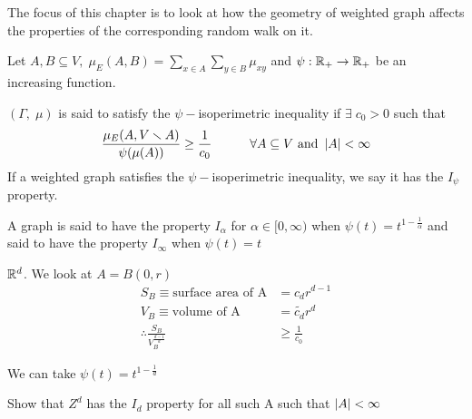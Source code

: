 \documentclass[main]{subfiles}
\begin{document}


The focus of this chapter is to look at how the geometry of weighted graph affects the properties of the corresponding random walk on it.

\begin{definition}
	Let $A, B \subseteq V, \; \mu_E(A,B) = \sum_{x \in A} \sum_{y \in B} \mu_{xy}$
	and $\psi: \mathbb R_+ \to \mathbb R_+$ be an increasing function.

	$(\Gamma,\;\mu)$ is said to satisfy the $\psi-$isoperimetric inequality if $\exists\;c_0>0$ such that
	\[\frac{\mu_E(A,V\smallsetminus A)}{\psi(\mu(A))} \geq \frac{1}{c_0} \hspace{3em} \forall A \subseteq V \text{ and }\left\lvert A\right\rvert < \infty\]
	If a weighted graph satisfies the $\psi-$isoperimetric inequality, we say it has the $I_\psi$ property.

	A graph is said to have the property $I_\alpha$ for $\alpha \in [0, \infty)$ when $\psi(t) = t^{1-\frac{1}{\alpha}}$
	and said to have the property $I_\infty$ when $\psi(t) = t$
\end{definition}

\ex
$\mathbb R^d$. We look at $A = B(0,r)$
\begin{align*}
	S_B                                       \equiv \text{surface area of A} & = c_d r^{d-1}         \\
	V_B                                       \equiv \text{volume of A}       & = \widetilde{c_d} r^d \\
	\therefore \frac{S_B}{V_B^\frac{d-1}{d}}                                  & \geq \frac{1}{c_0}
\end{align*}

We can take $\psi(t) = t^{1-\frac{1}{d}}$

Show that $Z^d$ has the $I_d$ property for all such A such that $\left\lvert A\right\rvert < \infty$\\
\end{document}
